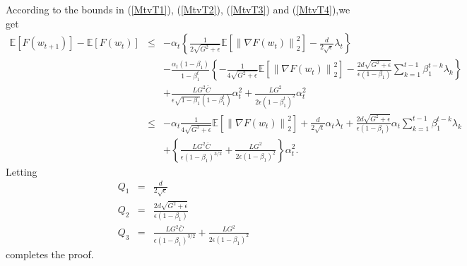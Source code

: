 \documentclass[twoside]{article}
\def\EE{\mathbb{E}}
\begin{document}
According to the bounds in (\ref{MtvT1}), (\ref{MtvT2}), (\ref{MtvT3}) and (\ref{MtvT4}),we get
\begin{eqnarray}
\EE[F(w_{t+1})] - \EE[F(w_t)] &\leq& -\alpha_t  \left\{\frac{1}{2\sqrt{G^2+\epsilon}} \EE\left[\left\|\nabla F(w_t)\right\|_2^2\right] - \frac{d}{2\sqrt{\epsilon}}\lambda_t \right\} \nonumber\\
&&-\frac{\alpha_t(1-\beta_1)}{1-\beta_1^t}\left\{ -\frac{1}{4\sqrt{G^2+\epsilon}}\EE\left[\left\|\nabla F(w_t)\right\|_2^2\right] - \frac{2d\sqrt{G^2+\epsilon}}{\epsilon (1-\beta_1)}\sum_{k=1}^{t-1} \beta_1^{t-k}\lambda_k\right\} \nonumber\\
&& + \frac{LG^2\bar C}{\epsilon\sqrt{1-\beta_1}(1-\beta_1^t)}\alpha_t^2 + \frac{LG^2}{2\epsilon(1-\beta_1^t)^2} \alpha_t^2\nonumber\\
&\leq& -\alpha_t \frac{1}{4\sqrt{G^2+\epsilon}}\EE\left[\left\|\nabla F(w_t)\right\|^2_2\right] + \frac{d}{2\sqrt{\epsilon}} \alpha_t\lambda_t + \frac{2d\sqrt{G^2+\epsilon}}{\epsilon(1-\beta_1)}\alpha_t\sum_{k=1}^{t-1}\beta_1^{t-k}\lambda_k\nonumber\\
&&+\left\{\frac{LG^2\bar C}{\epsilon(1-\beta_1)^{3/2}} + \frac{LG^2}{2\epsilon(1-\beta_1)^2} \right\}\alpha_t^2.\nonumber
\end{eqnarray}
Letting
\begin{eqnarray}
Q_1&=& \frac{d}{2\sqrt{\epsilon}}\nonumber\\
Q_2&=& \frac{2d\sqrt{G^2+\epsilon}}{\epsilon(1-\beta_1)}\nonumber\\
Q_3 &=& \frac{LG^2\bar C}{\epsilon(1-\beta_1)^{3/2}} + \frac{LG^2}{2\epsilon(1-\beta_1)^2} \nonumber
\end{eqnarray}
completes the proof.
\end{document}
